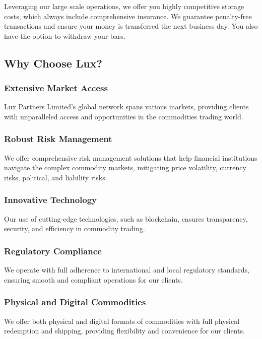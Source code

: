 \documentclass[11pt]{article}
\begin{document}
Leveraging our large scale operations, we offer you highly competitive storage costs, which always include comprehensive insurance. We guarantee penalty-free transactions and ensure your money is transferred the next business day. You also have the option to withdraw your bars.


\subsection{Why Choose Lux?}

\subsubsection{Extensive Market Access}

Lux Partners Limited's global network spans various markets, providing clients with unparalleled access and opportunities in the commodities trading world.


\subsubsection{Robust Risk Management}

We offer comprehensive risk management solutions that help financial institutions navigate the complex commodity markets, mitigating price volatility, currency risks, political, and liability risks.


\subsubsection{Innovative Technology}

Our use of cutting-edge technologies, such as blockchain, ensures transparency, security, and efficiency in commodity trading.


\subsubsection{Regulatory Compliance}

We operate with full adherence to international and local regulatory standards, ensuring smooth and compliant operations for our clients.


\subsubsection{Physical and Digital Commodities}

We offer both physical and digital formats of commodities with full physical redemption and shipping, providing flexibility and convenience for our clients.
\end{document}
